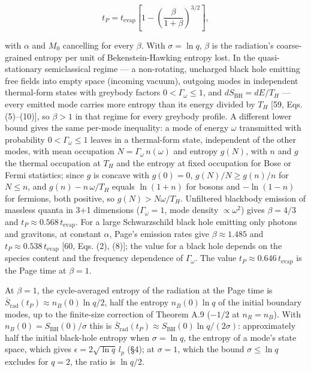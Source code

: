 \documentclass[
]{article}
\begin{document}
\[t_P = t_{\text{evap}}\left[1 - \left(\frac{\beta}{1+\beta}\right)^{3/2}\right],\]

with \(\alpha\) and \(M_0\) cancelling for every \(\beta\). With
\(\sigma = \ln q\), \(\beta\) is the radiation's coarse-grained entropy
per unit of Bekenstein-Hawking entropy lost. In the quasi-stationary
semiclassical regime --- a non-rotating, uncharged black hole emitting
free fields into empty space (incoming vacuum), outgoing modes in
independent thermal-form states with greybody factors
\(0 < \Gamma_\omega \leq 1\), and \(dS_{\text{BH}} = dE/T_H\) --- every
emitted mode carries more entropy than its energy divided by \(T_H\)
{[}59, Eqs. (5)--(10){]}, so \(\beta > 1\) in that regime for every
greybody profile. A different lower bound gives the same per-mode
inequality: a mode of energy \(\omega\) transmitted with probability
\(0 < \Gamma_\omega \leq 1\) leaves in a thermal-form state, independent
of the other modes, with mean occupation
\(N = \Gamma_\omega\,n(\omega)\) and entropy \(g(N)\), with \(n\) and
\(g\) the thermal occupation at \(T_H\) and the entropy at fixed
occupation for Bose or Fermi statistics; since \(g\) is concave with
\(g(0) = 0\), \(g(N)/N \geq g(n)/n\) for \(N \leq n\), and
\(g(n) - n\,\omega/T_H\) equals \(\ln(1+n)\) for bosons and
\(-\ln(1-n)\) for fermions, both positive, so \(g(N) > N\omega/T_H\).
Unfiltered blackbody emission of massless quanta in 3+1 dimensions
(\(\Gamma_\omega = 1\), mode density \(\propto \omega^2\)) gives
\(\beta = 4/3\) and \(t_P \approx 0.568\,t_{\text{evap}}\). For a large
Schwarzschild black hole emitting only photons and gravitons, at
constant \(\alpha\), Page's emission rates give \(\beta \approx 1.485\)
and \(t_P \approx 0.538\,t_{\text{evap}}\) {[}60, Eqs. (2), (8){]}; the
value for a black hole depends on the species content and the frequency
dependence of \(\Gamma_\omega\). The value
\(t_P \approx 0.646\,t_{\text{evap}}\) is the Page time at
\(\beta = 1\).

At \(\beta = 1\), the cycle-averaged entropy of the radiation at the
Page time is
\(\overline{S}_{\text{rad}}(t_P) \approx n_B(0) \ln q / 2\), half the
entropy \(n_B(0) \ln q\) of the initial boundary modes, up to the
finite-size correction of Theorem A.9 (\(-1/2\) at \(n_R = n_B\)). With
\(n_B(0) = S_{\text{BH}}(0)/\sigma\) this is
\(\overline{S}_{\text{rad}}(t_P) \approx S_{\text{BH}}(0) \ln q/(2\sigma)\):
approximately half the initial black-hole entropy when
\(\sigma = \ln q\), the entropy of a mode's state space, which gives
\(\epsilon = 2\sqrt{\ln q}\,l_p\) (§4); at \(\sigma = 1\), which the
bound \(\sigma \leq \ln q\) excludes for \(q = 2\), the ratio is
\(\ln q/2\).
\end{document}

